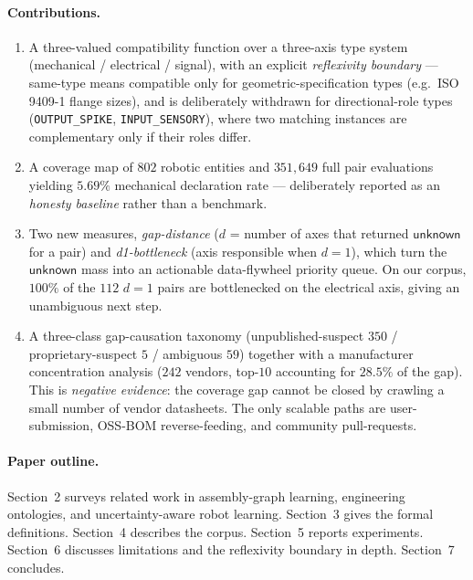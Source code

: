 \paragraph{Contributions.}
\begin{enumerate}[nosep]
\item A three-valued compatibility function over a three-axis type
system (mechanical / electrical / signal), with an explicit
\emph{reflexivity boundary} — same-type means compatible only for
geometric-specification types (e.g.\ ISO 9409-1 flange sizes), and is
deliberately withdrawn for directional-role types
(\texttt{OUTPUT\_SPIKE}, \texttt{INPUT\_SENSORY}), where two matching
instances are complementary only if their roles differ.

\item A coverage map of $802$ robotic entities and $351{,}649$ full
pair evaluations yielding $5.69\%$ mechanical declaration rate —
deliberately reported as an \emph{honesty baseline} rather than
a benchmark.

\item Two new measures, \emph{gap-distance} ($d$ = number of axes
that returned $\mathsf{unknown}$ for a pair) and \emph{d1-bottleneck}
(axis responsible when $d=1$), which turn the $\mathsf{unknown}$ mass
into an actionable data-flywheel priority queue. On our corpus,
$100\%$ of the $112$ $d=1$ pairs are bottlenecked on the electrical
axis, giving an unambiguous next step.

\item A three-class gap-causation taxonomy
(unpublished-suspect $350$ / proprietary-suspect $5$ / ambiguous $59$)
together with a manufacturer concentration analysis ($242$ vendors,
top-$10$ accounting for $28.5\%$ of the gap). This is
\emph{negative evidence}: the coverage gap cannot be closed by
crawling a small number of vendor datasheets. The only scalable paths
are user-submission, OSS-BOM reverse-feeding, and community pull-requests.
\end{enumerate}

\paragraph{Paper outline.}
Section~2 surveys related work in assembly-graph learning, engineering
ontologies, and uncertainty-aware robot learning. Section~3 gives the
formal definitions. Section~4 describes the corpus. Section~5 reports
experiments. Section~6 discusses limitations and the reflexivity
boundary in depth. Section~7 concludes.

